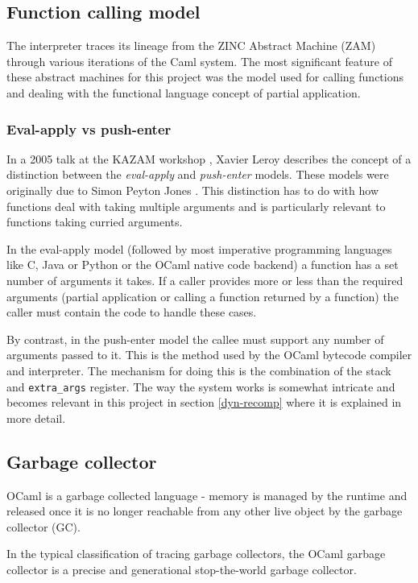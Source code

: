 \subsection{Function calling model}

The interpreter traces its lineage from the ZINC Abstract Machine (ZAM) \cite{zinc} through various
iterations of the Caml system. The most significant feature of these abstract machines for this
project was the model used for calling functions and dealing with the functional language concept
of partial application.

\subsubsection{Eval-apply vs push-enter}

In a 2005 talk at the KAZAM workshop \cite{xavtalk}, Xavier Leroy describes the concept of a
distinction between the \emph{eval-apply} and \emph{push-enter} models. These models were
originally due to Simon Peyton Jones \cite{jones}\cite{marlow-jones}. This distinction has to do
with how functions deal with taking
multiple arguments and is particularly relevant to functions taking curried arguments.

In the eval-apply model (followed by most imperative programming languages like C, Java or Python
or
the OCaml native code backend) a function has a set number of arguments it takes. If a caller
provides more or less than the required arguments (partial application or calling a function
returned by a function) the caller must contain the code to handle these cases.

By contrast, in the push-enter model the callee must support any number of arguments passed to it.
This is the method used by the OCaml bytecode compiler and interpreter. The mechanism for doing
this is the combination of the stack and \texttt{extra\_args} register. The way the system works is
somewhat intricate and becomes relevant in this project in section \ref{dyn-recomp} where it is
explained in more detail.

\subsection{Garbage collector}

OCaml is a garbage collected language - memory is managed by the runtime and released once it is
no longer reachable from any other live object by the garbage collector (GC).

In the typical classification of tracing garbage collectors, the OCaml garbage collector is a
precise and generational stop-the-world garbage collector.

